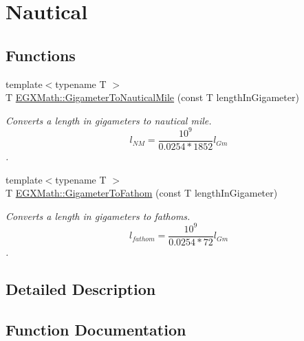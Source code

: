 \hypertarget{group___e_g_x_math-_conversions-_length_conversions-_gigameter-_nautical}{}\section{Nautical}
\label{group___e_g_x_math-_conversions-_length_conversions-_gigameter-_nautical}
\subsection*{Functions}
\begin{DoxyCompactItemize}
\item 
{\footnotesize template$<$typename T $>$ }\\T \mbox{\hyperlink{group___e_g_x_math-_conversions-_length_conversions-_gigameter-_nautical_ga52d7a5290f284cdfec247ba606967867}{E\+G\+X\+Math\+::\+Gigameter\+To\+Nautical\+Mile}} (const T length\+In\+Gigameter)
\begin{DoxyCompactList}\small\item\em Converts a length in gigameters to nautical mile. \[ l_{NM}= \frac{10^{9}}{0.0254 * 1852} l_{Gm} \]. \end{DoxyCompactList}\item 
{\footnotesize template$<$typename T $>$ }\\T \mbox{\hyperlink{group___e_g_x_math-_conversions-_length_conversions-_gigameter-_nautical_gac09c5a61b554d3c3c2df3e414aca0e73}{E\+G\+X\+Math\+::\+Gigameter\+To\+Fathom}} (const T length\+In\+Gigameter)
\begin{DoxyCompactList}\small\item\em Converts a length in gigameters to fathoms. \[ l_{fathom}= \frac{10^{9}}{0.0254 * 72} l_{Gm} \]. \end{DoxyCompactList}\end{DoxyCompactItemize}


\subsection{Detailed Description}


\subsection{Function Documentation}
\mbox{\label{group___e_g_x_math-_conversions-_length_conversions-_gigameter-_nautical_gac09c5a61b554d3c3c2df3e414aca0e73}} 

